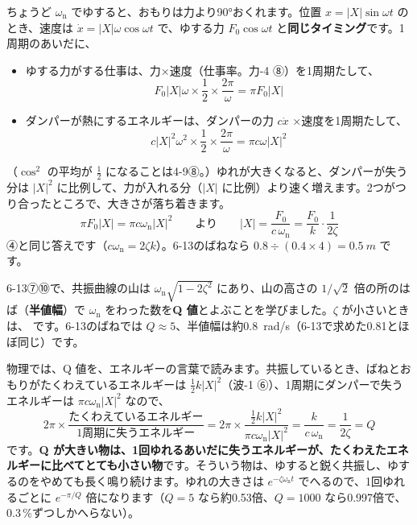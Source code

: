 ちょうど $\omega_{\mathrm n}$ でゆすると、おもりは力より90°おくれます。位置 $x=\lvert X\rvert\sin\omega t$ のとき、速度は $\dot x=\lvert X\rvert\omega\cos\omega t$ で、ゆする力 $F_0\cos\omega t$ と\textbf{同じタイミング}です。1周期のあいだに、
\begin{itemize}[leftmargin=1.2\zw, itemsep=2pt, topsep=2pt, label={\color{bkTheme}●}]
\item ゆする力がする仕事は、力×速度（仕事率。力-4 ⑧）を1周期たして、
\[F_0\lvert X\rvert\omega\times\frac{1}{2}\times\frac{2\pi}{\omega}=\pi F_0\lvert X\rvert\]
\item ダンパーが熱にするエネルギーは、ダンパーの力 $c\dot x$ ×速度を1周期たして、
\[c\lvert X\rvert^2\omega^2\times\frac{1}{2}\times\frac{2\pi}{\omega}=\pi c\omega\lvert X\rvert^2\]
\end{itemize}
（$\cos^2$ の平均が $\tfrac{1}{2}$ になることは4-9⑧。）ゆれが大きくなると、ダンパーが失う分は $\lvert X\rvert^2$ に比例して、力が入れる分（$\lvert X\rvert$ に比例）より速く増えます。2つがつり合ったところで、大きさが落ち着きます。
\[\pi F_0\lvert X\rvert=\pi c\omega_{\mathrm n}\lvert X\rvert^2\qquad\text{より}\qquad \lvert X\rvert=\frac{F_0}{c\,\omega_{\mathrm n}}=\frac{F_0}{k}\cdot\frac{1}{2\zeta}\]
④と同じ答えです（$c\omega_{\mathrm n}=2\zeta k$）。6-13のばねなら $0.8\div(0.4\times4)=\qty{0.5}{m}$ です。

6-13⑦⑩で、共振曲線の山は $\omega_{\mathrm n}\sqrt{1-2\zeta^2}$ にあり、山の高さの $1/\sqrt2$ 倍の所のはば（\textbf{半値幅}）で $\omega_{\mathrm n}$ をわった数を\textbf{Q 値}とよぶことを学びました。$\zeta$ が小さいときは、
\label{ph:波-2:q}です。6-13のばねでは $Q\approx5$、半値幅は約\qty{0.8}{rad/s}（6-13で求めた0.81とほぼ同じ）です。

物理では、Q 値を、エネルギーの言葉で読みます。共振しているとき、ばねとおもりがたくわえているエネルギーは $\tfrac{1}{2}k\lvert X\rvert^2$（波-1 ⑥）、1周期にダンパーで失うエネルギーは $\pi c\omega_{\mathrm n}\lvert X\rvert^2$ なので、
\[2\pi\times\frac{\text{たくわえているエネルギー}}{\text{1周期に失うエネルギー}}=2\pi\times\frac{\tfrac{1}{2}k\lvert X\rvert^2}{\pi c\omega_{\mathrm n}\lvert X\rvert^2}=\frac{k}{c\,\omega_{\mathrm n}}=\frac{1}{2\zeta}=Q\]
です。\textbf{Q が大きい物は、1回ゆれるあいだに失うエネルギーが、たくわえたエネルギーに比べてとても小さい物}です。そういう物は、ゆすると鋭く共振し、ゆするのをやめても長く鳴り続けます。ゆれの大きさは $e^{-\zeta\omega_{\mathrm n}t}$ でへるので、1回ゆれるごとに $e^{-\pi/Q}$ 倍になります（$Q=5$ なら約0.53倍、$Q=1000$ なら0.997倍で、0.3\,\%ずつしかへらない）。


